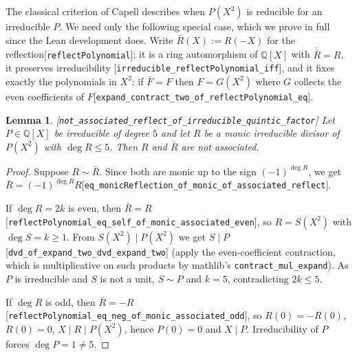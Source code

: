 \documentclass[10pt]{article}
\newtheorem{lemma}[theorem]{Lemma}
\theoremstyle{definition}
\theoremstyle{remark}
\newcommand{\Q}{\mathbb{Q}}
\newcommand{\leanref}[1]{{\scriptsize\textup{[\texttt{#1}]}}\allowbreak}
\begin{document}
The classical criterion of Capell describes when $P(X^2)$ is reducible for an
irreducible $P$.  We need only the following special case, which we prove in
full since the Lean development does.  Write $\bar R(X):=R(-X)$ for the
reflection\leanref{reflect\allowbreak Polynomial}; it is a ring automorphism of $\Q[X]$
with $\overline{\bar R}=R$, it preserves irreducibility
\leanref{irreducible\_\allowbreak reflect\allowbreak Polynomial\_\allowbreak iff}, and it fixes exactly the
polynomials in $X^2$: if $\bar F=F$ then $F=G(X^2)$ where $G$ collects the
even coefficients of $F$\leanref{expand\_\allowbreak contract\_\allowbreak two\_\allowbreak of\_\allowbreak reflect\allowbreak Polynomial\_\allowbreak eq}.

\begin{lemma}\label{lem:not-associated}
\leanref{not\_\allowbreak associated\_\allowbreak reflect\_\allowbreak of\_\allowbreak irreducible\_\allowbreak quintic\_\allowbreak factor}
Let $P\in\Q[X]$ be irreducible of degree $5$ and let $R$ be a monic
irreducible divisor of $P(X^2)$ with $\deg R\le5$.  Then $R$ and $\bar R$ are
not associated.
\end{lemma}

\begin{proof}
Suppose $R\sim\bar R$.  Since both are monic up to the sign $(-1)^{\deg R}$,
we get $\bar R=(-1)^{\deg R}R$\leanref{eq\_\allowbreak monic\allowbreak Reflection\_\allowbreak of\_\allowbreak monic\_\allowbreak of\_\allowbreak associated\_\allowbreak reflect}.

If $\deg R=2k$ is even, then $\bar R=R$
\leanref{reflect\allowbreak Polynomial\_\allowbreak eq\_\allowbreak self\_\allowbreak of\_\allowbreak monic\_\allowbreak associated\_\allowbreak even}, so $R=S(X^2)$
with $\deg S=k\ge1$.  From $S(X^2)\mid P(X^2)$ we get $S\mid P$
\leanref{dvd\_\allowbreak of\_\allowbreak expand\_\allowbreak two\_\allowbreak dvd\_\allowbreak expand\_\allowbreak two} (apply the even-coefficient
contraction, which is multiplicative on such products by mathlib's
\texttt{contract\_\allowbreak mul\_\allowbreak expand}).  As $P$ is irreducible and $S$ is not a unit,
$S\sim P$ and $k=5$, contradicting $2k\le5$.

If $\deg R$ is odd, then $\bar R=-R$
\leanref{reflect\allowbreak Polynomial\_\allowbreak eq\_\allowbreak neg\_\allowbreak of\_\allowbreak monic\_\allowbreak associated\_\allowbreak odd}, so $R(0)=-R(0)$,
$R(0)=0$, $X\mid R\mid P(X^2)$, hence $P(0)=0$ and $X\mid P$.  Irreducibility
of $P$ forces $\deg P=1\ne5$.
\end{proof}
\end{document}
